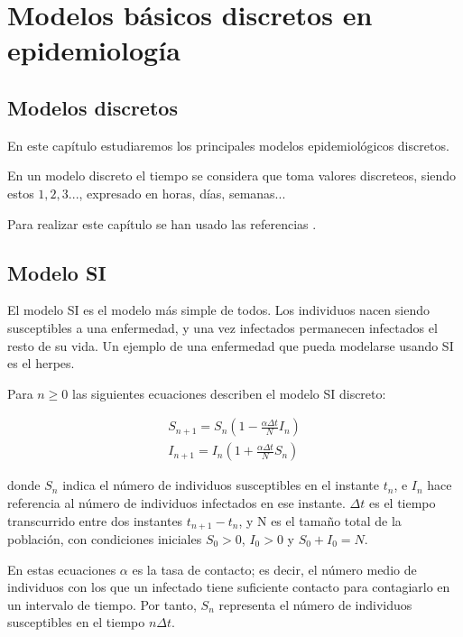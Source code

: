 \chapter{Modelos básicos discretos en epidemiología}

\section{Modelos discretos}

En este capítulo estudiaremos los principales modelos epidemiológicos discretos.

En un modelo discreto el tiempo se considera que toma valores discreteos, siendo estos $1,2,3...$, expresado en horas, días, semanas...

Para realizar este capítulo se han usado las referencias \cite{allenDiscretetimeSISIR1994}.

\section{Modelo SI}
El modelo SI es el modelo más simple de todos. Los individuos nacen siendo susceptibles a una enfermedad, y una vez infectados permanecen infectados el resto de su vida.
Un ejemplo de una enfermedad que pueda modelarse usando SI es el herpes.

Para $n\geq 0$ las siguientes ecuaciones describen el modelo SI discreto:

\begin{equation}
\label{eqn: SI}
\begin{aligned}
S_{n+1}=S_n\left( 1-\frac{\alpha\Delta t}{N}I_n\right) \\
I_{n+1}=I_n\left( 1+\frac{\alpha\Delta t}{N}S_n\right)
\end{aligned}
\end{equation}

donde $S_n$ indica el número de individuos susceptibles en el instante $t_n$, e $I_n$ hace referencia al número de individuos infectados en ese instante. $\Delta t$ es el tiempo transcurrido entre dos instantes $t_{n+1}-t_n$, y N es el tamaño total de la población, con condiciones iniciales $S_0>0$, $I_0>0$ y $S_0+I_0=N$.

En estas ecuaciones $\alpha$ es la tasa de contacto; es decir, el número medio de individuos con los que un infectado tiene suficiente contacto para contagiarlo en un intervalo de tiempo. Por tanto, $S_n$ representa el número de individuos susceptibles en el tiempo $n\Delta t$.


